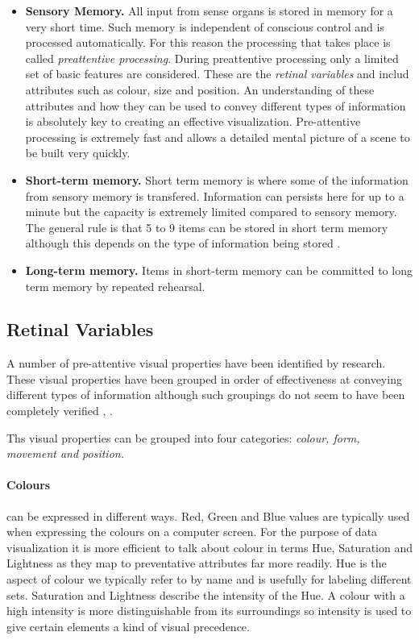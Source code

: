 \documentclass[a4paper, 11pt, titlepage, onehalfspacing]{report}
\begin{document}
\begin{itemize}
\item \textbf{Sensory Memory.} All input from sense organs is stored in memory for a very short time. Such memory is independent of conscious control and is processed automatically. For this reason the processing that takes place is called \textit{preattentive processing}. During preattentive processing only a limited set of basic features are considered. These are the \textit{retinal variables} and includ attributes such as colour, size and position. An understanding of these attributes and how they can be used to convey different types of information is absolutely key to creating an effective visualization. Pre-attentive processing is extremely fast and allows a detailed mental picture of a scene to be built very quickly.
\item \textbf{Short-term memory.} Short term memory is where some of the information from sensory memory is transfered. Information can persists here for up to a minute but the capacity is extremely limited compared to sensory memory. The general rule is that 5 to 9 items can be stored in short term memory although this depends on the type of information being stored \cite{Mil56}.
\item \textbf{Long-term memory.} Items in short-term memory can be committed to long term memory by repeated rehearsal.
\end{itemize}

\subsection{Retinal Variables}
A number of pre-attentive visual properties have been identified by research. These visual properties have been grouped in order of effectiveness at conveying different types of information although such groupings do not seem to have been completely verified \cite{mackinlay1986automating}, \cite{mazza2009introduction}. 

Ths visual properties can be grouped into four categories: \textit{colour, form, movement and position.} 

\paragraph{Colours}can be expressed in different ways. Red, Green and Blue values are typically used when expressing the colours on a computer screen. For the purpose of data visualization it is more efficient to talk about colour in terms Hue, Saturation and Lightness as they map to preventative attributes far more readily. Hue is the aspect of colour we typically refer to by name and is usefully for labeling different sets. Saturation and Lightness describe the intensity of the Hue. A colour with a high intensity is more distinguishable from its surroundings so intensity is used to give certain elements a kind of visual precedence.
\end{document}
